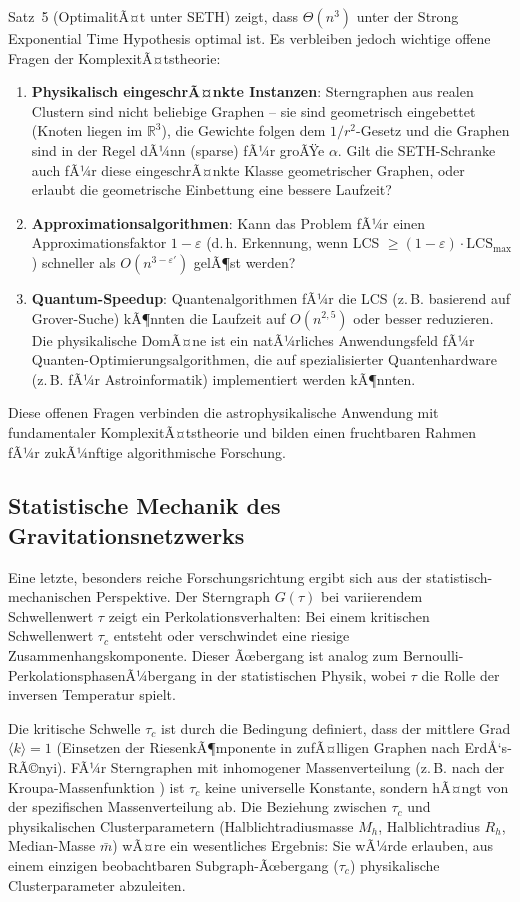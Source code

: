 ﻿\documentclass[a4paper,12pt]{report}
\theoremstyle{definition}
\begin{document}
Satz~5 (OptimalitÃ¤t unter SETH) zeigt, dass $\Theta(n^3)$ unter der Strong Exponential Time Hypothesis optimal ist. Es verbleiben jedoch wichtige offene Fragen der KomplexitÃ¤tstheorie:

\begin{enumerate}
    \item \textbf{Physikalisch eingeschrÃ¤nkte Instanzen}: Sterngraphen aus realen Clustern sind nicht beliebige Graphen -- sie sind geometrisch eingebettet (Knoten liegen im $\mathbb{R}^3$), die Gewichte folgen dem $1/r^2$-Gesetz und die Graphen sind in der Regel dÃ¼nn (sparse) fÃ¼r groÃŸe $\alpha$. Gilt die SETH-Schranke auch fÃ¼r diese eingeschrÃ¤nkte Klasse geometrischer Graphen, oder erlaubt die geometrische Einbettung eine bessere Laufzeit?
    \item \textbf{Approximationsalgorithmen}: Kann das Problem fÃ¼r einen Approximationsfaktor $1 - \varepsilon$ (d.\,h. Erkennung, wenn LCS $\geq (1-\varepsilon) \cdot \mathrm{LCS}_\mathrm{max}$) schneller als $O(n^{3-\varepsilon'})$ gelÃ¶st werden?
    \item \textbf{Quantum-Speedup}: Quantenalgorithmen fÃ¼r die LCS (z.\,B. basierend auf Grover-Suche) kÃ¶nnten die Laufzeit auf $O(n^{2{,}5})$ oder besser reduzieren. Die physikalische DomÃ¤ne ist ein natÃ¼rliches Anwendungsfeld fÃ¼r Quanten-Optimierungsalgorithmen, die auf spezialisierter Quantenhardware (z.\,B. fÃ¼r Astroinformatik) implementiert werden kÃ¶nnten.
\end{enumerate}

Diese offenen Fragen verbinden die astrophysikalische Anwendung mit fundamentaler KomplexitÃ¤tstheorie und bilden einen fruchtbaren Rahmen fÃ¼r zukÃ¼nftige algorithmische Forschung.

\subsection{Statistische Mechanik des Gravitationsnetzwerks}

Eine letzte, besonders reiche Forschungsrichtung ergibt sich aus der statistisch-mechanischen Perspektive. Der Sterngraph $G(\tau)$ bei variierendem Schwellenwert $\tau$ zeigt ein Perkolationsverhalten: Bei einem kritischen Schwellenwert $\tau_c$ entsteht oder verschwindet eine riesige Zusammenhangskomponente. Dieser Ãœbergang ist analog zum Bernoulli-Perkolationsphasen\-Ã¼bergang in der statistischen Physik, wobei $\tau$ die Rolle der inversen Temperatur spielt.

Die kritische Schwelle $\tau_c$ ist durch die Bedingung definiert, dass der mittlere Grad $\langle k \rangle = 1$ (Einsetzen der RiesenkÃ¶mponente in zufÃ¤lligen Graphen nach ErdÅ‘s-RÃ©nyi). FÃ¼r Sterngraphen mit inhomogener Massenverteilung (z.\,B. nach der Kroupa-Massenfunktion \cite{kroupa2001}) ist $\tau_c$ keine universelle Konstante, sondern hÃ¤ngt von der spezifischen Massenverteilung ab. Die Beziehung zwischen $\tau_c$ und physikalischen Clusterparametern (Halblichtradiusmasse $M_h$, Halblichtradius $R_h$, Median-Masse $\bar{m}$) wÃ¤re ein wesentliches Ergebnis: Sie wÃ¼rde erlauben, aus einem einzigen beobachtbaren Subgraph-Ãœbergang ($\tau_c$) physikalische Clusterparameter abzuleiten.
\end{document}
